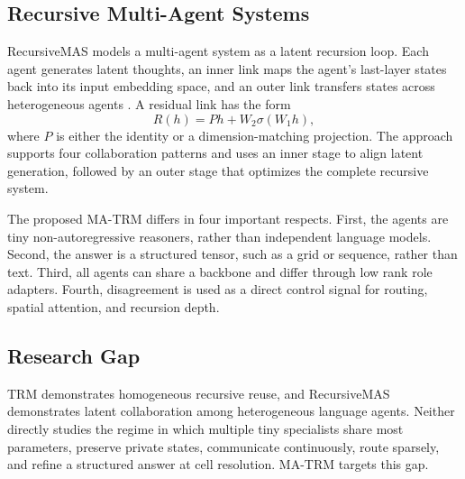 \documentclass[10pt,a4paper,twocolumn]{article}
\newcommand{\MA}{\textsc{MA-TRM}}
\begin{document}
\subsection{Recursive Multi-Agent Systems}
RecursiveMAS models a multi-agent system as a latent recursion loop. Each agent generates latent thoughts, an inner link maps the agent's last-layer states back into its input embedding space, and an outer link transfers states across heterogeneous agents \cite{yang2026recursivemas}. A residual link has the form
\begin{equation}
R(h)=Ph+W_2\sigma(W_1h), \label{eq:recursive_link_origin}
\end{equation}
where $P$ is either the identity or a dimension-matching projection. The approach supports four collaboration patterns and uses an inner stage to align latent generation, followed by an outer stage that optimizes the complete recursive system.

The proposed \MA{} differs in four important respects. First, the agents are tiny non-autoregressive reasoners, rather than independent language models. Second, the answer is a structured tensor, such as a grid or sequence, rather than text. Third, all agents can share a backbone and differ through low rank role adapters. Fourth, disagreement is used as a direct control signal for routing, spatial attention, and recursion depth.

\subsection{Research Gap}
TRM demonstrates homogeneous recursive reuse, and RecursiveMAS demonstrates latent collaboration among heterogeneous language agents. Neither directly studies the regime in which multiple tiny specialists share most parameters, preserve private states, communicate continuously, route sparsely, and refine a structured answer at cell resolution. \MA{} targets this gap.
\end{document}
